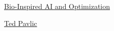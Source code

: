 \documentclass[11pt]{article}
\begin{document}
	\kaishu 
	\setcounter{section}{0}
	\begin{center}
		{\LARGE  \href{https://asu-iee598-bioinspired.blogspot.com/}{Bio-Inspired AI and Optimization}}
		
		\vspace{-0.25cm}
		
		{\large \href{https://search.asu.edu/profile/1995237}{Ted Pavlic}}
	\end{center}
\setcounter{page}{1}

\vspace{-1cm}
\end{document}
